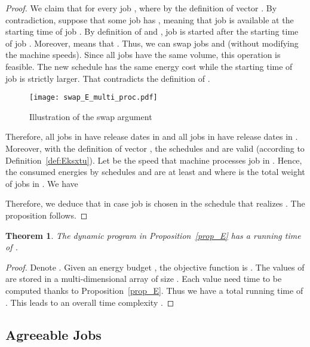 \documentclass[11pt,a4paper]{article}
\newtheorem{theorem}{Theorem}
\begin{document}
\begin{proof}
We claim that for every job ,  where 
by the definition of vector . 
By contradiction, suppose that some job 
has , meaning that job  is available at the starting time of 
job . By definition of  and , 
job  is started after the starting time of job . Moreover,  means that .
Thus, we can swap jobs  and  (without modifying the machine speeds). 
Since all jobs have the same volume, this operation 
is feasible. The new schedule has the same energy cost while the starting time of job  is
strictly larger. That contradicts the definition of .


\begin{figure}[!h]
\begin{center}
\texttt{[image: swap\_E\_multi\_proc.pdf]}
\end{center}
\caption{Illustration of the swap argument}
\label{fig_swap}
\end{figure}

Therefore, all jobs in  have release dates in 
and all jobs in  have release dates in .
Moreover, with the definition of vector , the schedules
 and  are valid (according to Definition~\ref{def:Eksxtu}).
Let  be the speed that machine  processes job
 in .
Hence, the consumed energies by schedules  and 
 are at least 
and  where 
 is the total weight of jobs in . 
We have

Therefore, we deduce that  in case 
job  is chosen in the schedule that realizes .
The proposition follows.
\end{proof}





\begin{theorem}\label{prop_complexity_non_preempt}
The dynamic program in Proposition~\ref{prop_E} has a running time of .
\end{theorem}


\begin{proof}
Denote .
Given an energy budget , the objective function is
.
The values of  are stored in a multi-dimensional array of
size .
Each value need   time to be computed thanks to Proposition~\ref{prop_E}.
Thus we have a total running time of .
This leads to an overall time complexity .
\end{proof}




\subsection{Agreeable Jobs}
\end{document}

